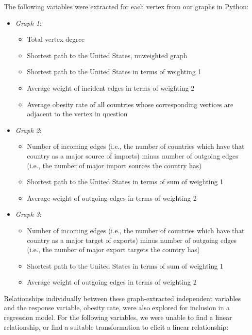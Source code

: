 \documentclass[oneside,12pt]{report}
\begin{document}
\noindent
The following variables were extracted for each vertex from our graphs in Python:
\begin{itemize}
\item \emph{Graph 1}:
	\begin{itemize}
	\item Total vertex degree
	\item Shortest path to the United States, unweighted graph
	\item Shortest path to the United States in terms of weighting 1
	\item Average weight of incident edges in terms of weighting 2
	\item Average obesity rate of all countries whose corresponding vertices are adjacent to the vertex in question
	\end{itemize}
\item \emph{Graph 2}:
	\begin{itemize}
	\item Number of incoming edges (i.e., the number of countries which have that country as a major source of imports) minus number of outgoing edges (i.e., the number of major import sources the country has)
	\item Shortest path to the United States in terms of sum of weighting 1
	\item Average weight of outgoing edges in terms of weighting 2
	\end{itemize}
\item \emph{Graph 3}:
	\begin{itemize}
	\item Number of incoming edges (i.e., the number of countries which have that country as a major target of exports) minus number of outgoing edges (i.e., the number of major export targets the country has)
	\item Shortest path to the United States in terms of sum of weighting 1
	\item Average weight of outgoing edges in terms of weighting 2
	\end{itemize}
\end{itemize}


Relationships individually between these graph-extracted independent variables and the response variable, obesity rate, were also explored for inclusion in a regression model. For the following variables, we were unable to find a linear relationship, or find a suitable transformation to elicit a linear relationship:
\end{document}
